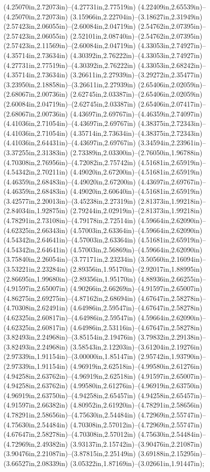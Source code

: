 (4.25070in,2.72073in)--(4.27731in,2.77519in) (4.22409in,2.65539in)--(4.25070in,2.72073in) (3.15966in,2.22704in)--(3.18627in,2.31949in) (2.57423in,2.06055in)--(2.60084in,2.04719in) (2.54762in,2.07395in)--(2.57423in,2.06055in) (2.52101in,2.08740in)--(2.54762in,2.07395in) (2.57423in,2.11569in)--(2.60084in,2.04719in) (4.33053in,2.74927in)--(4.35714in,2.73634in) (4.30392in,2.76222in)--(4.33053in,2.74927in) (4.27731in,2.77519in)--(4.30392in,2.76222in) (4.33053in,2.68242in)--(4.35714in,2.73634in) (3.26611in,2.27939in)--(3.29272in,2.35477in) (3.23950in,2.18858in)--(3.26611in,2.27939in) (2.65406in,2.02059in)--(2.68067in,2.00736in) (2.62745in,2.03387in)--(2.65406in,2.02059in) (2.60084in,2.04719in)--(2.62745in,2.03387in) (2.65406in,2.07417in)--(2.68067in,2.00736in) (4.43697in,2.69767in)--(4.46359in,2.74097in) (4.41036in,2.71054in)--(4.43697in,2.69767in) (4.38375in,2.72343in)--(4.41036in,2.71054in) (4.35714in,2.73634in)--(4.38375in,2.72343in) (4.41036in,2.64431in)--(4.43697in,2.69767in) (3.34594in,2.23961in)--(3.37255in,2.31383in) (2.73389in,2.03300in)--(2.76050in,1.96788in) (4.70308in,2.76956in)--(4.72082in,2.75742in) (4.51681in,2.65919in)--(4.54342in,2.70211in) (4.49020in,2.67200in)--(4.51681in,2.65919in) (4.46359in,2.68483in)--(4.49020in,2.67200in) (4.43697in,2.69767in)--(4.46359in,2.68483in) (4.49020in,2.60640in)--(4.51681in,2.65919in) (3.42577in,2.20013in)--(3.45238in,2.27319in) (2.81373in,1.99218in)--(2.84034in,1.92875in) (2.79244in,2.02919in)--(2.81373in,1.99218in) (4.78291in,2.73108in)--(4.79178in,2.72514in) (4.59664in,2.62090in)--(4.62325in,2.66343in) (4.57003in,2.63364in)--(4.59664in,2.62090in) (4.54342in,2.64641in)--(4.57003in,2.63364in) (4.51681in,2.65919in)--(4.54342in,2.64641in) (4.57003in,2.56869in)--(4.59664in,2.62090in) (3.75840in,2.26054in)--(3.77171in,2.23234in) (3.50560in,2.16094in)--(3.53221in,2.23284in) (2.89356in,1.95170in)--(2.92017in,1.88995in) (2.86695in,1.99680in)--(2.89356in,1.95170in) (4.88936in,2.66255in)--(4.91597in,2.65007in) (4.90266in,2.66269in)--(4.91597in,2.65007in) (4.86275in,2.69275in)--(4.87162in,2.68694in) (4.67647in,2.58278in)--(4.70308in,2.62491in) (4.64986in,2.59547in)--(4.67647in,2.58278in) (4.62325in,2.60817in)--(4.64986in,2.59547in) (4.59664in,2.62090in)--(4.62325in,2.60817in) (4.64986in,2.53116in)--(4.67647in,2.58278in) (3.82493in,2.24968in)--(3.85154in,2.19476in) (3.79832in,2.29138in)--(3.82493in,2.24968in) (3.58543in,2.12203in)--(3.61204in,2.19276in) (2.97339in,1.91154in)--(3.00000in,1.85147in) (2.95742in,1.93790in)--(2.97339in,1.91154in) (4.96919in,2.62518in)--(4.99580in,2.61276in) (4.94258in,2.63762in)--(4.96919in,2.62518in) (4.91597in,2.65007in)--(4.94258in,2.63762in) (4.99580in,2.61276in)--(4.96919in,2.63750in) (4.96919in,2.63750in)--(4.94258in,2.65457in) (4.94258in,2.65457in)--(4.91597in,2.66382in) (4.80952in,2.61920in)--(4.78291in,2.58656in) (4.78291in,2.58656in)--(4.75630in,2.54484in) (4.72969in,2.55747in)--(4.75630in,2.54484in) (4.70308in,2.57012in)--(4.72969in,2.55747in) (4.67647in,2.58278in)--(4.70308in,2.57012in) (4.75630in,2.54484in)--(4.72969in,2.49382in) (3.93137in,2.15742in)--(3.90476in,2.21087in) (3.90476in,2.21087in)--(3.87815in,2.25149in) (3.69188in,2.15295in)--(3.66527in,2.08339in) (3.05322in,1.87169in)--(3.02661in,1.91447in);
